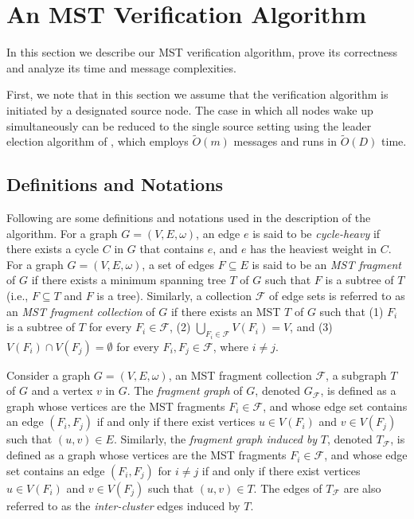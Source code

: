 \documentclass[11pt,letter]{article}
\def\cF{\mathcal{F}}
\begin{document}
\section{An MST Verification Algorithm}
\label{sec:alg}

In this section we describe our MST verification algorithm, 
prove its correctness and analyze its time and message complexities.

First, we note that in this section we assume that the verification algorithm 
is initiated by a designated source node. The case in which all nodes wake up 
simultaneously can be reduced to the single source setting using the 
leader election algorithm of \cite{KPPRT12}, which employs $\tilde{O}(m)$ 
messages and runs in $\tilde{O}(D)$ time.

\subsection{Definitions and Notations}

Following are some definitions and notations used in the description 
of the algorithm.
For a graph $G=(V,E,\omega)$, an edge $e$ is said to be {\em cycle-heavy} 
if there exists a cycle $C$ in $G$ that contains $e$, and $e$ has 
the heaviest weight in $C$.
For a graph $G=(V,E,\omega)$, a set of edges $F\subseteq E$ is said to be an 
{\em MST fragment} of $G$ if there exists a minimum spanning tree $T$ 
of $G$ such that $F$ is a subtree of $T$ 
(i.e., $F\subseteq T$ and $F$ is a tree). 
Similarly, a collection  $\cF$ of edge sets is referred to as an 
{\em MST fragment collection} 
of $G$ if there exists an MST  $T$ of $G$ 
such that 
(1) $F_i$ is a subtree of $T$  for every $F_i\in \cF$,
(2) $\bigcup_{F_i\in \cF} V(F_i)=V$,
and 
(3) $V(F_i) \cap V(F_j) =\emptyset$ for every $F_i,F_j\in \cF$, where $i\neq j$.

Consider a graph $G=(V,E,\omega)$, an MST fragment collection $\cF$,
a subgraph $T$ of $G$ and a vertex $v$ in $G$.
The {\em fragment graph} of $G$, denoted $G_{\cF}$, is defined as a graph 
whose vertices are the MST fragments $F_i\in \cF$, and whose edge set contains 
an edge $(F_i, F_j)$  if and only if there exist vertices $u\in V(F_i)$ and $v\in V(F_j)$ 
such that $(u,v)\in E$. Similarly,
the {\em fragment graph induced by} $T$, denoted $T_{\cF}$,  
is defined as a graph whose vertices are the MST fragments $F_i\in \cF$, 
and whose edge set contains an edge $(F_i, F_j)$ for $i\neq j$  if and only if there exist vertices 
$u\in V(F_i)$ and $v\in V(F_j)$ such that $(u,v)\in T$. The edges of $T_{\cF}$ 
are also referred to as the {\em inter-cluster} edges induced by $T$.
\end{document}
